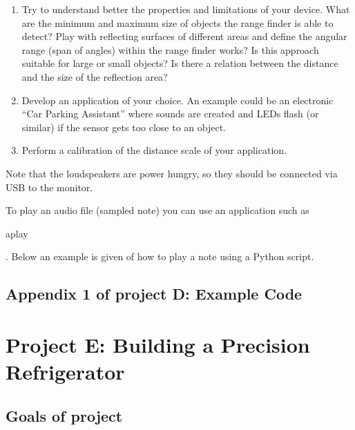 \begin{enumerate}

\item	Try to understand better the properties and limitations of your device. What are the minimum and maximum size of objects the range finder is able to detect? Play with reflecting surfaces of different areas and define the angular range (span of angles) within the range finder works? Is this approach suitable for large or small objects? Is there a relation between the distance and the size of the reflection area?

\item Develop an application of your choice. An example could be an electronic ``Car Parking Assistant'' where sounds are created and LEDs flash (or similar) if the sensor gets too close to an object.

\item Perform a calibration of the distance scale of your application.

\end{enumerate}

Note that the loudspeakers are power hungry, so they  should be connected  via USB to the 
monitor.

To play an audio file (sampled note) you can use an application such as \begin{tt}aplay\end{tt}. Below an example is given of how to play a note using a Python script.\\


\vspace*{-0.5cm}





\subsection*{Appendix 1 of project D: Example Code}




\newpage
\section{Project E: Building a Precision Refrigerator}

\subsection{Goals of project}

